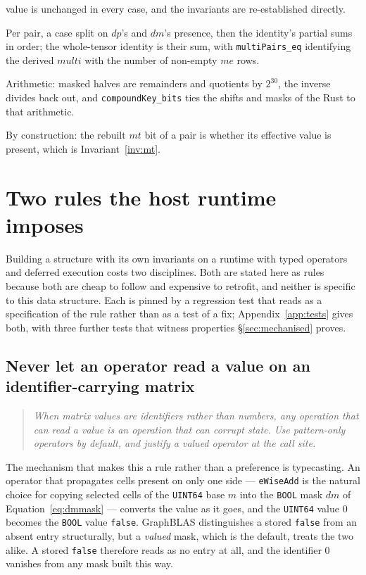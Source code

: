 \documentclass[11pt,a4paper]{article}
\theoremstyle{plain}
\theoremstyle{definition}
\theoremstyle{remark}
\begin{document}
\begin{description}
  value is unchanged in every case, and the invariants are re-established
  directly.
\item[Cardinality.] Per pair, a case split on $dp$'s and $dm$'s presence, then
  the identity's partial sums in order; the whole-tensor identity is their sum,
  with \texttt{multiPairs\_eq} identifying the derived $\textit{multi}$ with the
  number of non-empty $me$ rows.
\item[Compound key.] Arithmetic: masked halves are remainders and quotients by
  $2^{30}$, the inverse divides back out, and \texttt{compoundKey\_bits} ties the
  shifts and masks of the Rust to that arithmetic.
\item[Rebuilding the transpose.] By construction: the rebuilt $mt$ bit of a pair
  is whether its effective value is present, which is Invariant~\ref{inv:mt}.
\end{description}

\section{Two rules the host runtime imposes}
\label{sec:hazards}

Building a structure with its own invariants on a runtime with typed operators
and deferred execution costs two disciplines. Both are stated here as rules
because both are cheap to follow and expensive to retrofit, and neither is
specific to this data structure. Each is pinned by a regression test that reads
as a specification of the rule rather than as a test of a fix;
Appendix~\ref{app:tests} gives both, with three further tests that witness
properties \S\ref{sec:mechanised} proves.

\subsection{Never let an operator read a value on an identifier-carrying matrix}
\label{sec:hazard-zero}

\begin{quote}
\emph{When matrix values are identifiers rather than numbers, any operation
that can read a value is an operation that can corrupt state. Use
pattern-only operators by default, and justify a valued operator at the call
site.}
\end{quote}

The mechanism that makes this a rule rather than a preference is typecasting.
An operator that propagates cells present on only one side --- \texttt{eWiseAdd}
is the natural choice for copying selected cells of the \texttt{UINT64} base $m$
into the \texttt{BOOL} mask $dm$ of Equation~\eqref{eq:dmmask} --- converts the
value as it goes, and the \texttt{UINT64} value $0$ becomes the \texttt{BOOL}
value \texttt{false}. GraphBLAS distinguishes a stored \texttt{false} from an
absent entry structurally, but a \emph{valued} mask, which is the default,
treats the two alike. A stored \texttt{false} therefore reads as no entry at
all, and the identifier $0$ vanishes from any mask built this way.
\end{document}
